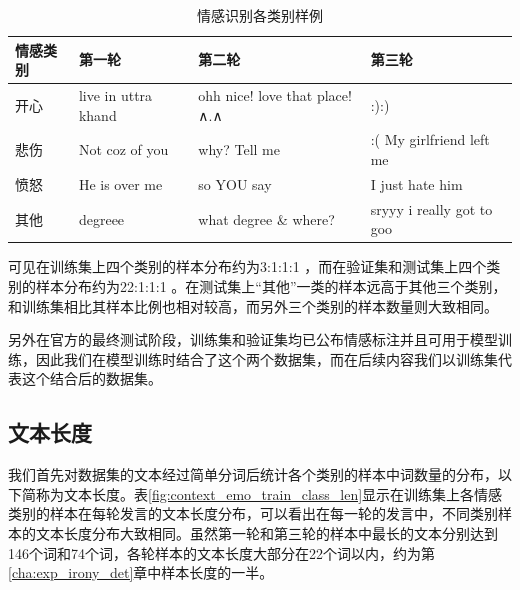 \begin{table}[htb]
  \centering
  \begin{minipage}[t]{\linewidth}
  \caption{情感识别各类别样例}
  \label{tab:semeval_2019_task3_sample}
    \begin{tabularx}{\linewidth}{l|XXX}
    \toprule[1.5pt]
    \small 情感类别 & 第一轮 & 第二轮 & 第三轮 \\
    \hline
    \small 开心 & live in uttra khand & ohh nice! love that place!∧.∧ & :):) \\
    \small 悲伤 & Not coz of you & why? Tell me & :( My girlfriend left me \\
    \small 愤怒 & He is over me & so YOU say & I just hate him \\  
    \small 其他 & degreee & what degree \& where? & sryyy i really got to goo\\
    \bottomrule[1.5pt]
    \end{tabularx}
  \end{minipage}
\end{table}

可见在训练集上四个类别的样本分布约为3:1:1:1 ，而在验证集和测试集上四个类别的样本分布约为22:1:1:1 。在测试集上“其他”一类的样本远高于其他三个类别，和训练集相比其样本比例也相对较高，而另外三个类别的样本数量则大致相同。

另外在官方的最终测试阶段，训练集和验证集均已公布情感标注并且可用于模型训练，因此我们在模型训练时结合了这个两个数据集，而在后续内容我们以训练集代表这个结合后的数据集。

\subsection{文本长度}

我们首先对数据集的文本经过简单分词后统计各个类别的样本中词数量的分布，以下简称为文本长度。表\ref{fig:context_emo_train_class_len}显示在训练集上各情感类别的样本在每轮发言的文本长度分布，可以看出在每一轮的发言中，不同类别样本的文本长度分布大致相同。虽然第一轮和第三轮的样本中最长的文本分别达到146个词和74个词，各轮样本的文本长度大部分在22个词以内，约为第\ref{cha:exp_irony_det}章中样本长度的一半。

